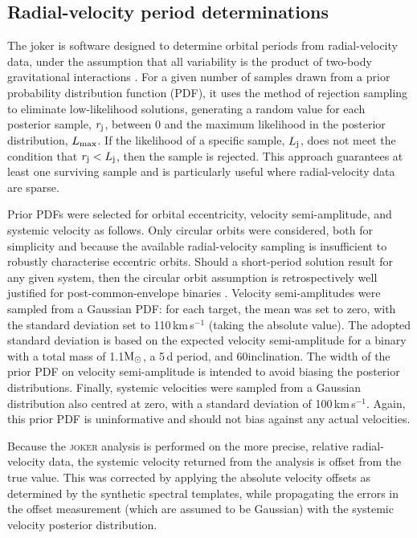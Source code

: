 \documentclass[fleqn,usenatbib,useAMS]{mnras}
\newcommand{\lw}[1]{\textcolor{black}{#1}}
\newcommand{\Msun}{\ensuremath{\rm{M}_\odot}}
\begin{document}
\subsection{Radial-velocity period determinations}
\label{SecRVPD}

The {\sc joker} is software designed to determine orbital periods from radial-velocity data, under the assumption that all variability is the product of two-body gravitational interactions \citep{Price2017,Joker}.  For a given number of samples drawn from \lw{a} prior probability distribution function (PDF), it uses the method of rejection sampling to eliminate low-likelihood solutions, generating a random value for each posterior sample, $r_{\rm j}$, between 0 and the maximum likelihood in the posterior distribution, $L_{\rm max}$.  If the likelihood of a specific sample, $L_{\rm j}$, does not meet the condition that $r_{\rm j} < {L}_{\rm j}$, then the sample is rejected.  This approach guarantees at least one surviving sample and is particularly useful where radial-velocity data are sparse.

Prior PDFs were selected for orbital eccentricity, velocity semi-amplitude, and systemic velocity as follows.  Only circular orbits were considered, both for simplicity and because the available radial-velocity sampling is insufficient to robustly characterise eccentric orbits.  Should a short-period solution result for any given system, then the circular orbit assumption is retrospectively well justified for post-common-envelope binaries \citep{Pac76,Pod01}.  Velocity semi-amplitudes were sampled from a Gaussian PDF: for each target, the mean was set to zero, with the standard deviation set to 110\,km\,s$^{-1}$ (taking the absolute value).  The adopted standard deviation is based on the expected velocity semi-amplitude for a binary with a total mass of 1.1\Msun, a 5\,d period, and 60\degr inclination.  The width of the prior PDF on velocity semi-amplitude is intended to avoid biasing the posterior distributions.  Finally, systemic velocities were sampled from a Gaussian distribution also centred at zero, with a standard deviation of 100\,km\,s$^{-1}$.  Again, this prior PDF is uninformative and should not bias against any actual velocities.  

Because the \textsc{joker} analysis is performed on the more precise, relative radial-velocity data, the systemic velocity returned from the analysis is offset from the true value.  This was corrected by applying the absolute velocity offsets as determined by the synthetic spectral templates, while propagating the errors in the offset measurement (which are assumed to be Gaussian) with the systemic velocity posterior distribution.
\end{document}
